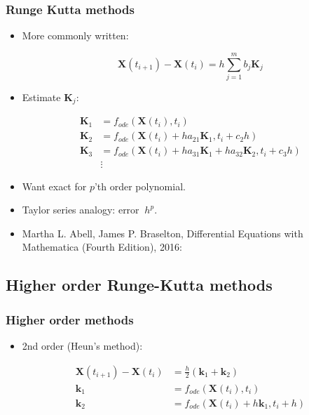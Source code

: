 \documentclass{beamer}
\begin{document}
\begin{frame}
\frametitle{Runge Kutta methods}
\begin{itemize}

\item<1-> More commonly written:

\begin{equation*}
\mathbf{X}(t_{i+1})-\mathbf{X}(t_{i}) =  h \sum_{j=1}^{m} b_j \mathbf{K}_j
\end{equation*}

\item<2-> Estimate $\mathbf{K}_j$:

\begin{align*}
\mathbf{K}_1 &= f_{ode}(\mathbf{X}(t_i),t_i)\\
\mathbf{K}_2 &= f_{ode}(\mathbf{X}(t_i)+ha_{21} \mathbf{K}_1,t_i+c_2 h)\\
\mathbf{K}_3 &= f_{ode}(\mathbf{X}(t_i)+ha_{31} \mathbf{K}_1+ha_{32} \mathbf{K}_2,t_i+c_3 h)\\
&\vdots
\end{align*}

\item<3-> Want exact for $p$'th order polynomial.

\item<4-> Taylor series analogy: error  $~h^p$.


\item<1-> {{\color{gray} Martha L. Abell, James P. Braselton, Differential Equations with Mathematica (Fourth Edition), 2016}}:
\end{itemize}
\end{frame}


\subsection{Higher order Runge-Kutta methods}


\begin{frame}
\frametitle{Higher order methods}
\begin{itemize}

\item<1-> 2nd order (Heun's method):

\begin{align*}
\mathbf{X}(t_{i+1})-\mathbf{X}(t_{i}) &= \frac{h}{2}(\mathbf{k}_1+\mathbf{k}_2)\\
\mathbf{k}_1 &= f_{ode}(\mathbf{X}(t_i),t_i)\\
\mathbf{k}_2 &= f_{ode}(\mathbf{X}(t_i)+h\mathbf{k}_1,t_i+h)
\end{align*}

\end{itemize}
\end{frame}
\end{document}
